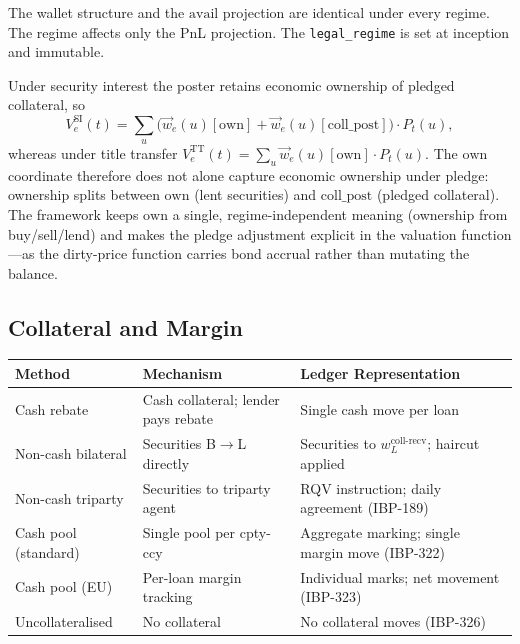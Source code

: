 The wallet structure and the $\mathrm{avail}$ projection are identical under every regime. The regime affects only the PnL projection. The \texttt{legal\_regime} is set at inception and immutable.

\begin{remark}
Under security interest the poster retains economic ownership of pledged collateral, so
\[
V_e^{\mathrm{SI}}(t) = \sum_u \bigl(\vec{w}_e(u)[\mathrm{own}] + \vec{w}_e(u)[\mathrm{coll\_post}]\bigr)\cdot P_t(u),
\]
whereas under title transfer $V_e^{\mathrm{TT}}(t) = \sum_u \vec{w}_e(u)[\mathrm{own}]\cdot P_t(u)$. The $\mathrm{own}$ coordinate therefore does not alone capture economic ownership under pledge: ownership splits between $\mathrm{own}$ (lent securities) and $\mathrm{coll\_post}$ (pledged collateral). The framework keeps $\mathrm{own}$ a single, regime-independent meaning (ownership from buy/sell/lend) and makes the pledge adjustment explicit in the valuation function---as the dirty-price function carries bond accrual rather than mutating the balance.
\end{remark}

\subsection{Collateral and Margin}
\label{sec:sbl-collateral}

\begin{center}
\small
\begin{tabular}{l p{3.5cm} p{5cm}}
\toprule
\textbf{Method} & \textbf{Mechanism} & \textbf{Ledger Representation} \\
\midrule
Cash rebate & Cash collateral; lender pays rebate & Single cash move per loan \\
Non-cash bilateral & Securities B$\to$L directly & Securities to $w^{\mathrm{coll\text{-}recv}}_L$; haircut applied \\
Non-cash triparty & Securities to triparty agent & RQV instruction; daily agreement (IBP-189) \\
Cash pool (standard) & Single pool per cpty-ccy & Aggregate marking; single margin move (IBP-322) \\
Cash pool (EU) & Per-loan margin tracking & Individual marks; net movement (IBP-323) \\
Uncollateralised & No collateral & No collateral moves (IBP-326) \\
\bottomrule
\end{tabular}
\end{center}

